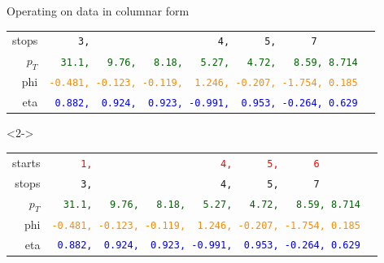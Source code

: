 \documentclass[aspectratio=169]{beamer}
\begin{document}
\begin{frame}[fragile]{Operating on data in columnar form}
\begin{onlyenv}
\begin{tabular}{r l}
\small stops   &                    {\tt\scriptsize \ \ \ \ \ 3,\ \ \ \ \ \ \ \ \ \ \ \ \ \ \ \ \ \ \ \ \ \ 4,\ \ \ \ \ \ 5,\ \ \ \ \ \ 7\ \ \ \ \ \ \ \ \ } \\
\small $p_T$ & \textcolor{darkgreen}{\tt\scriptsize \ \ 31.1,\ \ \ 9.76,\ \ \ 8.18,\ \ \ 5.27,\ \ \ 4.72,\ \ \ 8.59, 8.714} \\
\small phi &  \textcolor{darkorange}{\tt\scriptsize -0.481,\ -0.123,\ -0.119,\ \ 1.246,\ -0.207,\ -1.754,\ 0.185} \\
\small eta &        \textcolor{blue}{\tt\scriptsize \ 0.882,\ \ 0.924,\ \ 0.923,\ -0.991,\ \ 0.953,\ -0.264,\ 0.629} \\
\end{tabular}
\end{onlyenv}\begin{onlyenv}<2->
\begin{tabular}{r l}
\small starts  &     \textcolor{red}{\tt\scriptsize \ \ \ \ \ 1,\ \ \ \ \ \ \ \ \ \ \ \ \ \ \ \ \ \ \ \ \ \ 4,\ \ \ \ \ \ 5,\ \ \ \ \ \ 6\ \ \ \ \ \ \ \ \ } \\
\small stops   &                    {\tt\scriptsize \ \ \ \ \ 3,\ \ \ \ \ \ \ \ \ \ \ \ \ \ \ \ \ \ \ \ \ \ 4,\ \ \ \ \ \ 5,\ \ \ \ \ \ 7\ \ \ \ \ \ \ \ \ } \\
\small $p_T$ & \textcolor{darkgreen}{\tt\scriptsize \ \ 31.1,\ \ \ 9.76,\ \ \ 8.18,\ \ \ 5.27,\ \ \ 4.72,\ \ \ 8.59, 8.714} \\
\small phi &  \textcolor{darkorange}{\tt\scriptsize -0.481,\ -0.123,\ -0.119,\ \ 1.246,\ -0.207,\ -1.754,\ 0.185} \\
\small eta &        \textcolor{blue}{\tt\scriptsize \ 0.882,\ \ 0.924,\ \ 0.923,\ -0.991,\ \ 0.953,\ -0.264,\ 0.629} \\
\end{tabular}\end{onlyenv}
\vspace{0.25 cm}

\large
\vspace{0.2 cm}
\end{frame}
\end{document}
